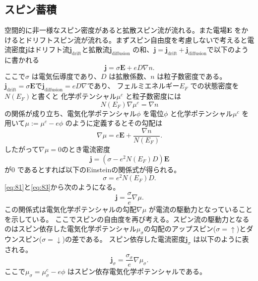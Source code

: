 \documentclass[dvipdfmx]{jsreport}
\numberwithin{equation}{chapter}
\numberwithin{table}{chapter}
\begin{document}
\subsection{スピン蓄積}
空間的に非一様なスピン密度があると拡散スピン流が流れる。また電場$\bm{E}$ をかけるとドリフトスピン流が流れる。まずスピン自由度を考慮しないで考えると電流密度$\bm{j}$はドリフト流$\bm{j}_\text{drift} $と拡散流$\bm{j}_\text{diffusion} $ の和、$\bm{j}=\bm{j}_\text{drift} +\bm{j}_\text{diffusion} $で以下のように書かれる
\begin{equation}
\label{eq:79}
	\bm{j}=\sigma \bm{E}+eD\nabla n
.\end{equation}
ここで$\sigma$ は電気伝導度であり、$D$ は拡散係数、$n$ は粒子数密度である。
$\bm{j}_\text{drift} =\sigma \bm{E}$で$\bm{j}_\text{diffusion} =eD\nabla $であり、
フェルミエネルギー$E_F$ での状態密度を$N(E_F)$と書くと 化学ポテンシャル$\mu^{c}$ と粒子数密度には
\begin{equation}
\label{eq:80}
	N(E_F)\nabla \mu^{c}=\nabla n
\end{equation}
の関係が成り立ち、電気化学ポテンシャル$\phi$ を電位$\phi$ と化学ポテンシャル$\mu^{c}$ を用いて$\mu:=\mu^{c}-e\phi$ のように定義するとその勾配は
\begin{equation}
\label{eq:81}
	\nabla \mu = e\bm{E}+\frac{\nabla n}{N(E_F)}
.\end{equation}
したがって$\nabla \mu = 0$のとき電流密度
\begin{equation}
\label{eq:82}
	\bm{j}=(\sigma-e^2N(E_F)D)\bm{E}
\end{equation}
が$0$ であるとすれば以下のEinsteinの関係式が得られる。
\begin{equation}
\label{eq:83}
	\sigma=e^2N(E_F)D
.\end{equation}
\eqref{eq:81}と\eqref{eq:83}から次のようになる。
\begin{equation}
\label{eq:84}
	\bm{j}=\frac{\sigma}{e}\nabla \mu
.\end{equation}
この関係式は電気化学ポテンシャルの勾配$\nabla \mu$ が電流の駆動力となっていることを示している。
ここでスピンの自由度を再び考える。スピン流の駆動力となるのはスピン依存した電気化学ポテンシャル$\mu_{\sigma}$の勾配のアップスピン($\sigma=\uparrow$)とダウンスピン($\sigma=\downarrow$)の差である。
スピン依存した電流密度$\bm{j}_{\sigma}$ は以下のように表される。
\begin{equation}
\label{eq:85}
	\bm{j}_{\sigma}=\frac{\sigma_{\sigma}}{e}\nabla \mu_{\sigma}
.\end{equation}
ここで$\mu_\sigma= \mu_{\sigma}^{c}-e\phi$ はスピン依存電気化学ポテンシャルである。
\end{document}
